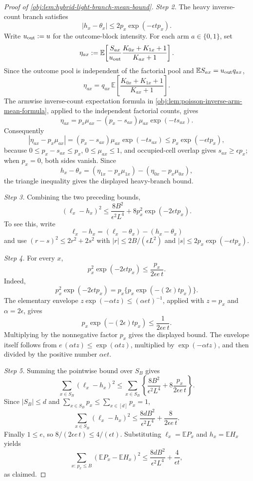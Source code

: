 \documentclass[11pt]{article}
\begin{document}
\begin{proof}[Proof of \cref{obj:lem:hybrid-light-branch-mean-bound}]
\emph{Step 2.} The heavy inverse-count branch satisfies
\[
|h_x-\theta_x|
\le
2p_x\exp(-\epsilon t p_x).
\]
Write \(u_{\rm out}:=u\) for the outcome-block intensity.  For each arm
\(a\in\{0,1\}\), set
\[
\eta_{ax}:=
\mathbb E\!\left[
\frac{S_{ax}}{u_{\rm out}}\frac{K_{0x}+K_{1x}+1}{K_{ax}+1}
\right].
\]
Since the outcome pool is independent of the factorial pool and
\(\mathbb E S_{ax}=u_{\rm out}q_{ax}\),
\[
\eta_{ax}
=
q_{ax}\,
\mathbb E\!\left[\frac{K_{0x}+K_{1x}+1}{K_{ax}+1}\right].
\]
The armwise inverse-count expectation formula in
\cref{obj:lem:poisson-inverse-arm-mean-formula}, applied to the independent factorial counts,
gives
\[
\eta_{ax}
=
p_x\mu_{ax}-(p_x-s_{ax})\mu_{ax}\exp(-t s_{ax}).
\]
Consequently
\[
|\eta_{ax}-p_x\mu_{ax}|
=
(p_x-s_{ax})\mu_{ax}\exp(-t s_{ax})
\le
p_x\exp(-\epsilon t p_x),
\]
because \(0\le p_x-s_{ax}\le p_x\), \(0\le\mu_{ax}\le1\), and occupied-cell overlap gives
\(s_{ax}\ge\epsilon p_x\); when \(p_x=0\), both sides vanish. Since
\[
h_x-\theta_x=(\eta_{1x}-p_x\mu_{1x})-(\eta_{0x}-p_x\mu_{0x}),
\]
the triangle inequality gives the displayed heavy-branch bound. %

\emph{Step 3.} Combining the two preceding bounds,
\[
(\ell_x-h_x)^2
\le
\frac{8B^2}{\epsilon^2L^4}
+
8p_x^2\exp(-2\epsilon t p_x).
\]
To see this, write
\[
\ell_x-h_x=(\ell_x-\theta_x)-(h_x-\theta_x)
\]
and use \((r-s)^2\le 2r^2+2s^2\) with
\(|r|\le 2B/(\epsilon L^2)\) and
\(|s|\le 2p_x\exp(-\epsilon t p_x)\). %

\emph{Step 4.} For every \(x\),
\[
p_x^2\exp(-2\epsilon t p_x)
\le
\frac{p_x}{2\epsilon e\,t}.
\]
Indeed,
\[
p_x^2\exp(-2\epsilon t p_x)
=
p_x\{p_x\exp(-(2\epsilon)t p_x)\}.
\]
The elementary envelope \(z\exp(-\alpha t z)\le(\alpha e t)^{-1}\), applied with
\(z=p_x\) and \(\alpha=2\epsilon\), gives
\[
p_x\exp(-(2\epsilon)t p_x)\le \frac{1}{2\epsilon e\,t}.
\]
Multiplying by the nonnegative factor \(p_x\) gives the displayed bound. The envelope itself follows from
\(e\,(\alpha t z)\le \exp(\alpha t z)\), multiplied by
\(\exp(-\alpha t z)\), and then divided by the positive number \(\alpha e t\). %

\emph{Step 5.} Summing the pointwise bound over \(S_B\) gives
\[
\sum_{x\in S_B}(\ell_x-h_x)^2
\le
\sum_{x\in S_B}
\left\{
\frac{8B^2}{\epsilon^2L^4}
+
8\frac{p_x}{2\epsilon e\,t}
\right\}.
\]
Since \(|S_B|\le d\) and \(\sum_{x\in S_B}p_x\le\sum_{x\in[d]}p_x=1\),
\[
\sum_{x\in S_B}(\ell_x-h_x)^2
\le
\frac{8dB^2}{\epsilon^2L^4}
+
\frac{8}{2\epsilon e\,t}.
\]
Finally \(1\le e\), so \(8/(2\epsilon e\,t)\le 4/(\epsilon t)\). Substituting
\(\ell_x=\mathbb E P_x\) and \(h_x=\mathbb E H_x\) yields
\[
\sum_{x:\,p_x\le B}
\left(\mathbb E P_x-\mathbb E H_x\right)^2
\le
\frac{8dB^2}{\epsilon^2L^4}
+
\frac{4}{\epsilon t},
\]
as claimed. %
\end{proof}
\end{document}
